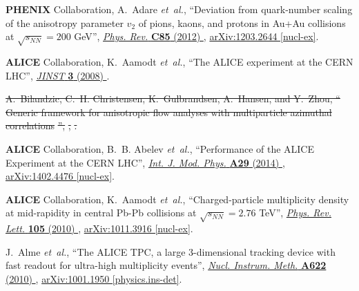 \documentclass[ALICE,manyauthors]{cernphprep}
\providecommand{\DIFdeltex}[1]{{\protect\color{red}\sout{#1}}}                      %
\providecommand{\DIFdelbegin}{} %
\providecommand{\DIFdelend}{} %
\providecommand{\DIFdel}[1]{\texorpdfstring{\DIFdeltex{#1}}{}} %
\begin{document}
\begin{thebibliography}{10}
{\bfseries PHENIX} Collaboration, A.~Adare {\em et~al.}, ``{Deviation from
  quark-number scaling of the anisotropy parameter $v_2$ of pions, kaons, and
  protons in Au+Au collisions at $\sqrt{s_{NN}} = 200$ GeV}'',
  \href{http://dx.doi.org/10.1103/PhysRevC.85.064914}{{\em Phys. Rev.}
  {\bfseries C85} (2012) },
\href{http://arxiv.org/abs/1203.2644}{{\ttfamily arXiv:1203.2644 [nucl-ex]}}.

{\bfseries ALICE} Collaboration, K.~Aamodt {\em et~al.}, ``{The ALICE
  experiment at the CERN LHC}'',
\href{http://dx.doi.org/10.1088/1748-0221/3/08/S08002}{{\em JINST} {\bfseries
  3} (2008) }.

\DIFdelbegin %
\DIFdel{A.~Bilandzic, C.~H. Christensen, K.~Gulbrandsen, A.~Hansen, and Y.~Zhou,
  ``}%
\DIFdel{Generic framework for anisotropic flow analyses with multiparticle
  azimuthal correlations}%
\DIFdel{'',
  }%
\DIFdel{,
}%
\DIFdel{.
}%

\DIFdelend {}
{\bfseries ALICE} Collaboration, B.~B. Abelev {\em et~al.}, ``{Performance of
  the ALICE Experiment at the CERN LHC}'',
  \href{http://dx.doi.org/10.1142/S0217751X14300440}{{\em Int. J. Mod. Phys.}
  {\bfseries A29} (2014) },
\href{http://arxiv.org/abs/1402.4476}{{\ttfamily arXiv:1402.4476 [nucl-ex]}}.

{\bfseries ALICE} Collaboration, K.~Aamodt {\em et~al.}, ``{Charged-particle
  multiplicity density at mid-rapidity in central Pb-Pb collisions at
  $\sqrt{s_{NN}} = 2.76$ TeV}'',
  \href{http://dx.doi.org/10.1103/PhysRevLett.105.252301}{{\em Phys. Rev.
  Lett.} {\bfseries 105} (2010) },
\href{http://arxiv.org/abs/1011.3916}{{\ttfamily arXiv:1011.3916 [nucl-ex]}}.

J.~Alme {\em et~al.}, ``{The ALICE TPC, a large 3-dimensional tracking device
  with fast readout for ultra-high multiplicity events}'',
  \href{http://dx.doi.org/10.1016/j.nima.2010.04.042}{{\em Nucl. Instrum.
  Meth.} {\bfseries A622} (2010) },
\href{http://arxiv.org/abs/1001.1950}{{\ttfamily arXiv:1001.1950
  [physics.ins-det]}}.


\end{thebibliography}
\end{document}
